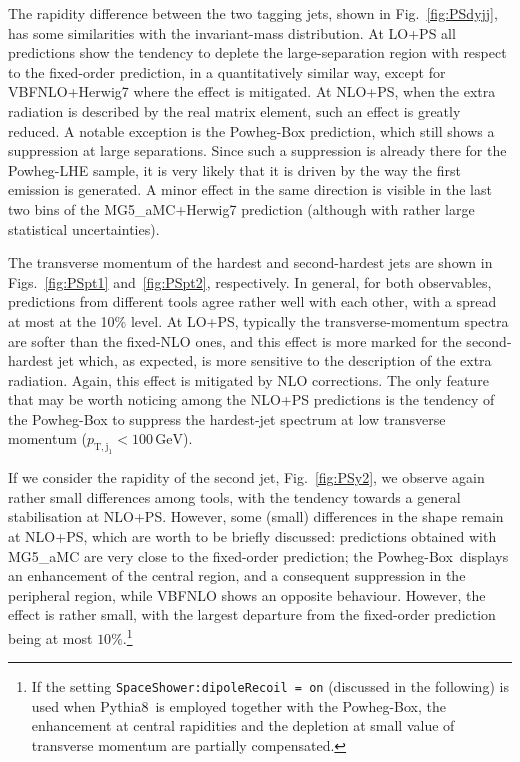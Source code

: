 \documentclass[twocolumn,epjc3]{svjour3} %
\newcommand{\Pj}{\ensuremath{\text{j}}\xspace}
\newcommand{\GeV}{\ensuremath{\,\text{GeV}}\xspace}
\newcommand{\ptsub}[1]{\ensuremath{p_{\text{T},#1}}\xspace}
\begin{document}
The rapidity difference between the two tagging jets, shown in Fig.~\ref{fig:PSdyjj}, has some similarities with the invariant-mass distribution.
At LO+PS all predictions show the tendency to deplete the large-separation region with respect to the fixed-order prediction, in a
quantitatively similar way,
except for {\sc VBFNLO+Herwig7} where the effect is mitigated. At 
NLO+PS, when the extra radiation is described by the real matrix element, such an effect is greatly reduced. A notable
exception is the {\sc Powheg-Box} prediction, which still shows a suppression at large separations.
Since such a suppression is already there for the {\sc Powheg-LHE} sample,
it is very likely that it is driven by the way the first emission is generated. A minor effect in the same direction is visible in the last two bins of the
{\sc MG5\_aMC+Herwig7} prediction (although with rather large statistical uncertainties).



The transverse momentum of the hardest and second-hardest jets are shown in Figs.~\ref{fig:PSpt1} and~\ref{fig:PSpt2}, respectively. In general, for both observables,
predictions from different tools agree rather well with each other, with a spread at most at the 10\% level. At LO+PS, typically the transverse-momentum spectra are softer than
the fixed-NLO ones, and this effect is more marked for the second-hardest jet which, as expected, is more sensitive to the description of the extra radiation. Again, this
effect is mitigated by NLO corrections. The only feature that may be worth noticing among the NLO+PS predictions is the tendency of the {\sc Powheg-Box} to suppress the
hardest-jet spectrum at low transverse momentum ($\ptsub{\Pj_1}<100 \GeV$).

If we consider the rapidity of the second jet, Fig.~\ref{fig:PSy2}, we observe again rather small differences among tools, with the tendency towards a general
stabilisation at NLO+PS. However, some (small) differences in the shape remain at NLO+PS, which are worth to be briefly discussed: predictions
obtained with {\sc MG5\_aMC} are very close to the fixed-order prediction; the {\sc Powheg-Box}\ displays an enhancement of the central region, and a consequent suppression in the
peripheral region, while {\sc VBFNLO} shows an opposite behaviour. However, the effect is rather small, with the largest departure from the fixed-order prediction being
at most $10\%$.\footnote{If the setting {\tt SpaceShower:dipole\-Recoil = on} (discussed in the following)
is used when {\sc Pythia8}\ is employed together with the {\sc Powheg-Box}, the enhancement at central rapidities and the depletion
at small value of transverse momentum are partially compensated.}
\end{document}
